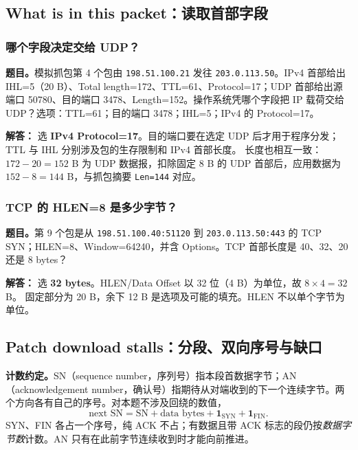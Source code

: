 \documentclass[11pt,a4paper,fontset=fandol]{ctexart}
\renewcommand{\exercisequestion}[2]{%
  \Needspace{5\baselineskip}%
  \subsubsection{#2}\label{exercise:#1}%
}
\renewenvironment{checkedsolution}
  {\par\nopagebreak[4]\textbf{解答：}\ignorespaces}
  {\par}
\begin{document}
\subsection{What is in this packet：读取首部字段}

\exercisequestion{SC2008-HW04-Q05}{哪个字段决定交给 UDP？}
\textbf{题目。}模拟抓包第 4 个包由 \texttt{198.51.100.21} 发往 \texttt{203.0.113.50}。IPv4 首部给出 IHL=5（20 B）、Total length=172、TTL=61、Protocol=17；UDP 首部给出源端口 50780、目的端口 3478、Length=152。操作系统凭哪个字段把 IP 载荷交给 UDP？选项：TTL=61；目的端口 3478；IHL=5；IPv4 的 Protocol=17。
\begin{checkedsolution}
选 \textbf{IPv4 Protocol=17}。目的端口要在选定 UDP 后才用于程序分发；TTL 与 IHL 分别涉及包的生存限制和 IPv4 首部长度。
长度也相互一致：$172-20=152$ B 为 UDP 数据报，扣除固定 8 B 的 UDP 首部后，应用数据为 $152-8=144$ B，与抓包摘要 \texttt{Len=144} 对应。
\end{checkedsolution}

\exercisequestion{SC2008-HW04-Q06}{TCP 的 HLEN=8 是多少字节？}
\textbf{题目。}第 9 个包是从 \texttt{198.51.100.40:51120} 到 \texttt{203.0.113.50:443} 的 TCP SYN；HLEN=8、Window=64240，并含 Options。TCP 首部长度是 40、32、20 还是 8 bytes？
\begin{checkedsolution}
选 \textbf{32 bytes}。HLEN/Data Offset 以 32 位（4 B）为单位，故 $8\times4=32$ B。
固定部分为 20 B，余下 12 B 是选项及可能的填充。HLEN 不以单个字节为单位。
\end{checkedsolution}

\subsection{Patch download stalls：分段、双向序号与缺口}

\textbf{计数约定。}SN（sequence number，序列号）指本段首数据字节；AN（acknowledgement number，确认号）指期待从对端收到的下一个连续字节。两个方向各有自己的序号。对本题不涉及回绕的数值，
\[
  \text{next SN}=\text{SN}+\text{data bytes}
  +\mathbf{1}_{\mathrm{SYN}}+\mathbf{1}_{\mathrm{FIN}}.
\]
SYN、FIN 各占一个序号，纯 ACK 不占；有数据且带 ACK 标志的段仍按\emph{数据字节数}计数。AN 只有在此前字节连续收到时才能向前推进。
\end{document}
